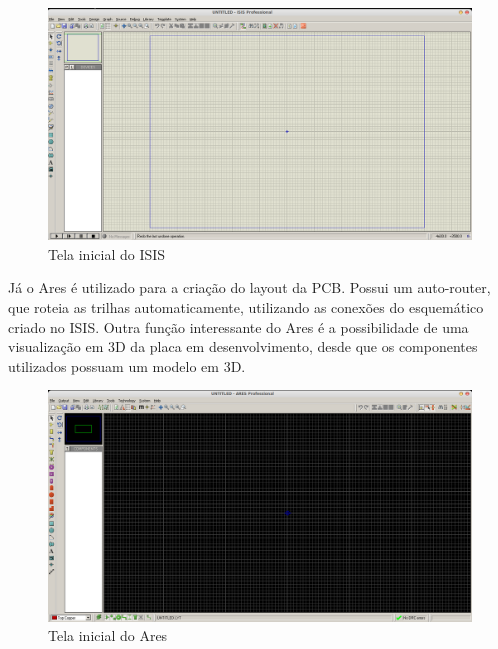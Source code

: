 \begin{figure}[htb]
\center
\includegraphics[width=1\textwidth]{./include/chapters/sections/hard/section1/img/Isis_homescreen.png}
\caption{Tela inicial do ISIS}
\label{IsisHome}
\end{figure}

J\'a o Ares \'e utilizado para a criaç\~ao do layout da PCB. Possui um auto-router, que roteia as trilhas automaticamente, utilizando as conex\~oes do esquem\'atico criado no ISIS. Outra funç\~ao interessante do Ares \'e a possibilidade de uma visualizaç\~ao em 3D da placa em desenvolvimento, desde que os componentes utilizados possuam um modelo em 3D.

\begin{figure}[htb]
\center
\includegraphics[width=1\textwidth]{./include/chapters/sections/hard/section1/img/Ares_homescreen.png}
\caption{Tela inicial do Ares}
\label{AresHome}
\end{figure}


